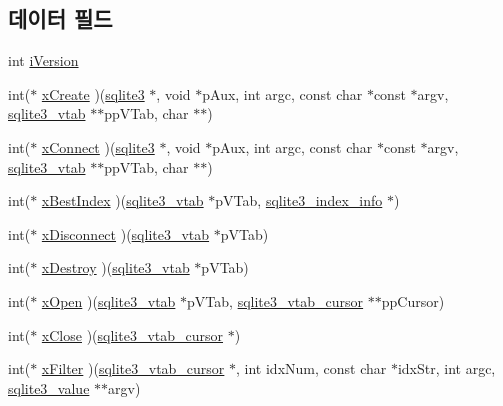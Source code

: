 \subsection*{데이터 필드}
\begin{DoxyCompactItemize}
\item 
int \hyperlink{structsqlite3__module_a42b11d080dc205aea43581b18f925afe}{i\+Version}
\item 
int($\ast$ \hyperlink{structsqlite3__module_a5934e38da1222cac999d01d372af293e}{x\+Create} )(\hyperlink{sqlite3_8h_a0ef6f2646262c8a9b24368d8ac140f69}{sqlite3} $\ast$, void $\ast$p\+Aux, int argc, const char $\ast$const $\ast$argv, \hyperlink{structsqlite3__vtab}{sqlite3\+\_\+vtab} $\ast$$\ast$pp\+V\+Tab, char $\ast$$\ast$)
\item 
int($\ast$ \hyperlink{structsqlite3__module_a457fe622b5334195640e3e835c9923a8}{x\+Connect} )(\hyperlink{sqlite3_8h_a0ef6f2646262c8a9b24368d8ac140f69}{sqlite3} $\ast$, void $\ast$p\+Aux, int argc, const char $\ast$const $\ast$argv, \hyperlink{structsqlite3__vtab}{sqlite3\+\_\+vtab} $\ast$$\ast$pp\+V\+Tab, char $\ast$$\ast$)
\item 
int($\ast$ \hyperlink{structsqlite3__module_aad92b2cd56253baaeac656d7693ce4af}{x\+Best\+Index} )(\hyperlink{structsqlite3__vtab}{sqlite3\+\_\+vtab} $\ast$p\+V\+Tab, \hyperlink{structsqlite3__index__info}{sqlite3\+\_\+index\+\_\+info} $\ast$)
\item 
int($\ast$ \hyperlink{structsqlite3__module_a0107afd3c350db14098edbaae04342df}{x\+Disconnect} )(\hyperlink{structsqlite3__vtab}{sqlite3\+\_\+vtab} $\ast$p\+V\+Tab)
\item 
int($\ast$ \hyperlink{structsqlite3__module_a0ec3414a65bb24f400e8cfd820751412}{x\+Destroy} )(\hyperlink{structsqlite3__vtab}{sqlite3\+\_\+vtab} $\ast$p\+V\+Tab)
\item 
int($\ast$ \hyperlink{structsqlite3__module_a3f1e18ef5e5bd4ddbd9500c7cd951f34}{x\+Open} )(\hyperlink{structsqlite3__vtab}{sqlite3\+\_\+vtab} $\ast$p\+V\+Tab, \hyperlink{structsqlite3__vtab__cursor}{sqlite3\+\_\+vtab\+\_\+cursor} $\ast$$\ast$pp\+Cursor)
\item 
int($\ast$ \hyperlink{structsqlite3__module_acc6c4d6d41f3d056e297eea9725b887c}{x\+Close} )(\hyperlink{structsqlite3__vtab__cursor}{sqlite3\+\_\+vtab\+\_\+cursor} $\ast$)
\item 
int($\ast$ \hyperlink{structsqlite3__module_a46ba11ba4d07f7fdcab4f35bf2045300}{x\+Filter} )(\hyperlink{structsqlite3__vtab__cursor}{sqlite3\+\_\+vtab\+\_\+cursor} $\ast$, int idx\+Num, const char $\ast$idx\+Str, int argc, \hyperlink{sqlite3_8h_ac2fa1ecdb2290d9af6010edbd1cbc83c}{sqlite3\+\_\+value} $\ast$$\ast$argv)

\end{DoxyCompactItemize}
